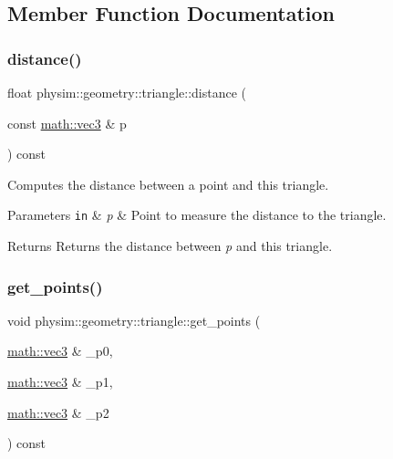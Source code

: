 \subsection{Member Function Documentation}
\mbox{\label{classphysim_1_1geometry_1_1triangle_a0a2c713287510cf43a00ca3139af27b8}} 
\subsubsection{\texorpdfstring{distance()}{distance()}}
{\footnotesize\ttfamily float physim\+::geometry\+::triangle\+::distance (\begin{DoxyParamCaption}\item[{const \hyperlink{structphysim_1_1math_1_1vec3}{math\+::vec3} \&}]{p }\end{DoxyParamCaption}) const}



Computes the distance between a point and this triangle. 


\begin{DoxyParams}[1]{Parameters}
\mbox{\tt in}  & {\em p} & Point to measure the distance to the triangle. \\
\hline
\end{DoxyParams}
\begin{DoxyReturn}{Returns}
Returns the distance between {\itshape p} and this triangle. 
\end{DoxyReturn}
\mbox{\label{classphysim_1_1geometry_1_1triangle_a6d78d93d66524dacd0270c3d6c293319}} 
\subsubsection{\texorpdfstring{get\+\_\+points()}{get\_points()}}
{\footnotesize\ttfamily void physim\+::geometry\+::triangle\+::get\+\_\+points (\begin{DoxyParamCaption}\item[{\hyperlink{structphysim_1_1math_1_1vec3}{math\+::vec3} \&}]{\+\_\+p0,  }\item[{\hyperlink{structphysim_1_1math_1_1vec3}{math\+::vec3} \&}]{\+\_\+p1,  }\item[{\hyperlink{structphysim_1_1math_1_1vec3}{math\+::vec3} \&}]{\+\_\+p2 }\end{DoxyParamCaption}) const}



